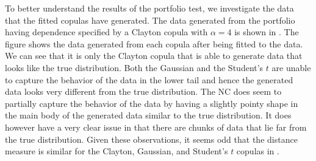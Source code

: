 To better understand the results of the portfolio test, we investigate the data that the fitted copulas have generated. The data generated from the portfolio having dependence specified by a Clayton copula with $\alpha=4$ is shown in . The figure shows the data generated from each copula after being fitted to the data. We can see that it is only the Clayton copula that is able to generate data that looks like the true distribution. Both the Gaussian and the Student's $t$ are unable to capture the behavior of the data in the lower tail and hence the generated data looks very different from the true distribution. The \gls{NC} does seem to partially capture the behavior of the data by having a slightly pointy shape in the main body of the generated data similar to the true distribution. It does however have a very clear issue in that there are chunks of data that lie far from the true distribution. Given these observations, it seems odd that the distance measure is similar for the Clayton, Gaussian, and Student's $t$ copulas in .

